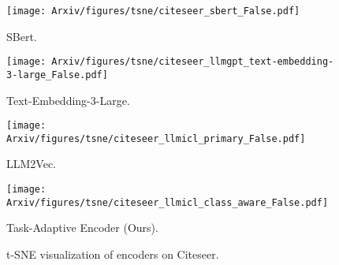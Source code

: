 \begin{wrapfigure}{r}{0.5\textwidth}
    \centering
    \begin{minipage}{0.45\linewidth}
    \captionsetup{labelformat=empty}
        \texttt{[image: Arxiv/figures/tsne/citeseer\_sbert\_False.pdf]}
        \vspace{-0.8cm}
        \caption*{\scriptsize SBert.}
    \end{minipage}
    \begin{minipage}{0.45\linewidth}
    \captionsetup{labelformat=empty}
        \texttt{[image: Arxiv/figures/tsne/citeseer\_llmgpt\_text-embedding-3-large\_False.pdf]}
        \vspace{-0.8cm}
        \caption*{\scriptsize Text-Embedding-3-Large.}
    \end{minipage}
    \vspace{-0.2cm} %
    \begin{minipage}{0.45\linewidth}
    \captionsetup{labelformat=empty}
        \texttt{[image: Arxiv/figures/tsne/citeseer\_llmicl\_primary\_False.pdf]}
        \vspace{-0.8cm}
        \caption*{\scriptsize LLM2Vec.}
    \end{minipage}
    \begin{minipage}{0.45\linewidth}
    \captionsetup{labelformat=empty}
        \texttt{[image: Arxiv/figures/tsne/citeseer\_llmicl\_class\_aware\_False.pdf]}
        \vspace{-0.8cm}
        \caption*{\scriptsize Task-Adaptive Encoder (Ours).}
    \end{minipage}
    \caption{t-SNE visualization of encoders on Citeseer.}
    \label{fig:tsne}
\end{wrapfigure}